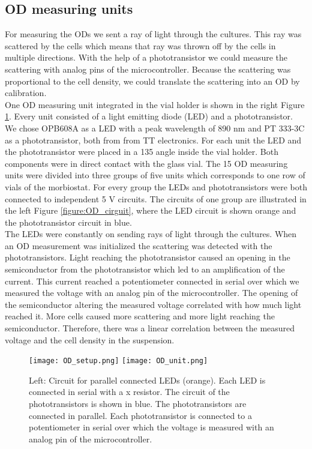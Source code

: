 \subsection{OD measuring units}
For measuring the ODs we sent a ray of light through the cultures. This ray was scattered by the cells which means that ray was thrown off by the cells in multiple directions. With the help of a phototransistor we could measure the scattering with analog pins of the microcontroller. Because the scattering was proportional to the cell density, we could translate the scattering into an OD by calibration. \\
One OD measuring unit integrated in the vial holder is shown in  the right Figure \ref{figure:OD_unit}. Every unit consisted of a light emitting diode (LED) and a phototransistor. We chose OPB608A as a LED with a peak wavelength of 890 nm and PT 333-3C as a phototransistor, both from from TT electronics. For each unit the LED and the phototransistor were placed in a 135 \degree \space angle inside the vial holder. Both components were in direct contact with the glass vial.
The 15 OD measuring units were divided into three groups of five units which corresponds to one row of vials of the morbiostat. For every group the LEDs and phototransistors were both connected to independent 5 V circuits. The circuits of one group are illustrated in the left Figure \ref{figure:OD_cirguit}, where the LED circuit is shown orange and the phototransistor circuit in blue. \\
The LEDs were constantly on sending rays of light through the cultures. When an OD measurement was initialized the scattering was detected with the phototransistors. Light reaching the phototransistor caused an opening in the semiconductor from the phototransistor which led to an amplification of the current. This current reached a potentiometer connected in serial over which we measured the voltage with an analog pin of the microcontroller. The opening of the semiconductor altering the measured voltage correlated with how much light reached it. More cells caused more scattering and more light reaching the semiconductor. Therefore, there was a linear correlation between the measured voltage and the cell density in the suspension. \\

\label{section:OD}
\begin{figure}
	\texttt{[image: OD\_setup.png]}
	\texttt{[image: OD\_unit.png]}
	\caption{Left: Circuit for parallel connected LEDs (orange). Each LED is connected in serial with a x \textOmega \space resistor. The circuit of the phototransistors is shown in blue. The phototransistors are connected in parallel. Each phototransistor is connected to a potentiometer in serial over which the voltage is measured with an analog pin of the microcontroller.}
	\label{figure:OD_cirguit}
	\label{figure:OD_unit}
\end{figure}

